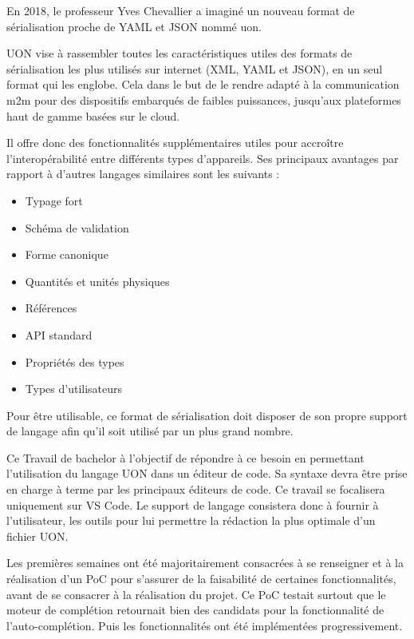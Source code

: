 
En 2018, le professeur Yves Chevallier a imaginé un nouveau format de sérialisation proche de YAML et JSON nommé \Gls{uon}.

UON vise à rassembler toutes les caractéristiques utiles des formats de sérialisation les plus utilisés sur internet (XML, YAML et JSON),
en un seul format qui les englobe. Cela dans le but de le rendre adapté à la communication \Gls{m2m} pour des dispositifs embarqués de faibles puissances, jusqu'aux plateformes haut de gamme basées sur le cloud.

Il offre donc des fonctionnalités supplémentaires utiles pour accroître l'interopérabilité entre différents types d'appareils. Ses principaux avantages par rapport à d'autres langages similaires sont les suivants :

\begin{itemize}
    \item Typage fort
    \item Schéma de validation
    \item Forme canonique
    \item Quantités et unités physiques
    \item Références
    \item API standard
    \item Propriétés des types
    \item Types d'utilisateurs
\end{itemize}

Pour être utilisable, ce format de sérialisation doit disposer de son propre support de langage afin qu'il soit utilisé par un plus grand nombre.

Ce Travail de bachelor à l'objectif de répondre à ce besoin en permettant l'utilisation du langage UON dans un éditeur de code.
Sa syntaxe devra être prise en charge à terme par les principaux éditeurs de code. Ce travail se focalisera uniquement sur VS Code.
Le support de langage consistera donc à fournir à l'utilisateur, les outils pour lui permettre la rédaction la plus optimale d'un fichier UON.

Les premières semaines ont été majoritairement consacrées à se renseigner et à la réalisation d'un \Gls{PoC} pour s'assurer de la faisabilité de certaines fonctionnalités, avant de se consacrer à la réalisation du projet.
Ce PoC testait surtout que le moteur de complétion retournait bien des candidats pour la fonctionnalité de l'auto-complétion.
Puis les fonctionnalités ont été implémentées progressivement.

